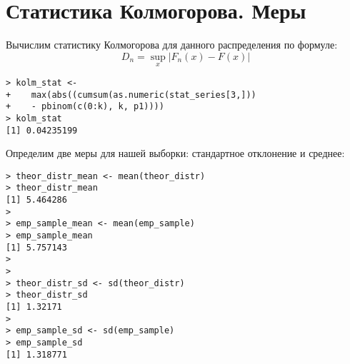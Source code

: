 \documentclass[14pt,a4paper]{scrartcl}
\begin{document}
\begin{figure}[h]
	\label{ris:image}
\end{figure}

\section{Статистика Колмогорова. Меры}
Вычислим статистику Колмогорова для данного распределения по формуле:
\begin{equation*}
	D_{n}=\sup _{x}\left|F_{n}(x)-F(x)\right|
\end{equation*}

\begin{verbatim}
> kolm_stat <- 
+    max(abs((cumsum(as.numeric(stat_series[3,]))
+    - pbinom(c(0:k), k, p1))))
> kolm_stat
[1] 0.04235199
\end{verbatim}

Определим две меры для нашей выборки: стандартное отклонение и среднее:
\begin{verbatim}
> theor_distr_mean <- mean(theor_distr)
> theor_distr_mean
[1] 5.464286
> 
> emp_sample_mean <- mean(emp_sample)
> emp_sample_mean
[1] 5.757143
> 
> 
> theor_distr_sd <- sd(theor_distr)
> theor_distr_sd
[1] 1.32171
> 
> emp_sample_sd <- sd(emp_sample)
> emp_sample_sd
[1] 1.318771
\end{verbatim}
\end{document}
